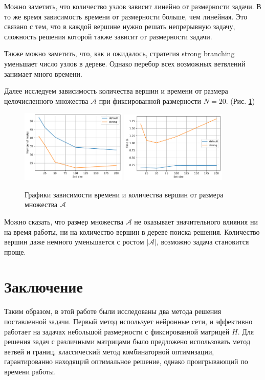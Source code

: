 \documentclass[12pt]{article}
\begin{document}
Можно заметить, что количество узлов зависит линейно от размерности задачи. В то же время зависимость времени от размерности больше, чем линейная. Это связано с тем, что в каждой вершине нужно решать непрерывную задачу, сложность решения которой также зависит от размерности задачи.

Также можно заметить, что, как и ожидалось, стратегия strong branching уменьшает число узлов в дереве. Однако перебор всех возможных ветвлений занимает много времени.

Далее исследуем зависимость количества вершин и времени от размера целочисленного множества $\mathcal{A}$ при фиксированной размерности $N = 20$. (Рис. \ref{branch_and_bound_set_size})
\begin{figure}[H]
    \centering
    \includegraphics[width=0.45\textwidth]{branch_and_bound_n_nodes_set_size.pdf}
    \quad
    \includegraphics[width=0.45\textwidth]{branch_and_bound_time_set_size.pdf}
    \caption{Графики зависимости времени и количества вершин от размера множества $\mathcal{A}$}
    \label{branch_and_bound_set_size}
\end{figure}

Можно сказать, что размер множества $\mathcal{A}$ не оказывает значительного влияния ни на время работы, ни на количество вершин в дереве поиска решения. Количество вершин даже немного уменьшается с ростом $|\mathcal{A}|$, возможно задача становится проще.

\section{Заключение}
Таким образом, в этой работе были исследованы два метода решения поставленной задачи. Первый метод использует нейронные сети, и эффективно работает на задачах небольшой размерности с фиксированной матрицей $H$. Для решения задач с различными матрицами было предложено использовать метод ветвей и границ, классический метод комбинаторной оптимизации, гарантированно находящий оптимальное решение, однако проигрывающий по времени работы.
\end{document}
